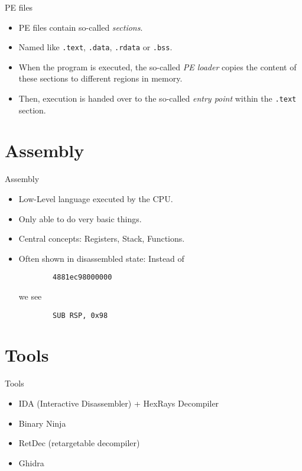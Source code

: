 \documentclass{beamer}
\begin{document}
  \begin{frame}[fragile]{PE files}\pause
    \begin{itemize}
      \item PE files contain so-called \emph{sections}.\pause
      \item Named like \verb|.text|, \verb|.data|, \verb|.rdata| or \verb|.bss|.\pause
      \item When the program is executed, the so-called \emph{PE loader} copies the content of these sections
      to different regions in memory.\pause
      \item Then, execution is handed over to the so-called \emph{entry point} within the \verb|.text| section.
    \end{itemize}
  \end{frame}

  \section{Assembly}
  \begin{frame}[fragile]{Assembly}\pause
    \begin{itemize}
      \item Low-Level language executed by the CPU.\pause
      \item Only able to do very basic things.\pause
      \item Central concepts: Registers, Stack, Functions.\pause
      \item Often shown in disassembled state\pause: Instead of
      \begin{verbatim}
        4881ec98000000
      \end{verbatim}
      \pause we see
      \begin{lstlisting}
        SUB RSP, 0x98
      \end{lstlisting}
      \end{itemize}
  \end{frame}

  \section{Tools}
  \begin{frame}{Tools}\pause
    \begin{itemize}
      \item IDA \pause (Interactive Disassembler) \pause + HexRays Decompiler\pause
      \item Binary Ninja\pause
      \item RetDec \pause (retargetable decompiler)\pause
      \item Ghidra
    \end{itemize}
  \end{frame}
\end{document}
